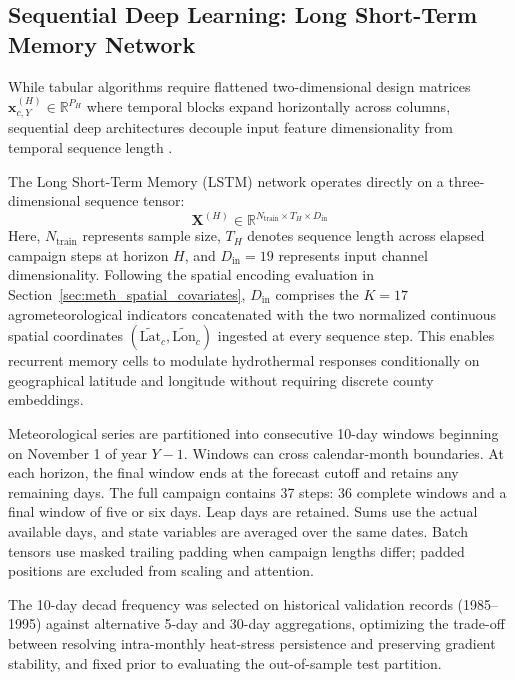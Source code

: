 \subsection{Sequential Deep Learning: Long Short-Term Memory Network}
\label{sec:meth_lstm}

While tabular algorithms require flattened two-dimensional design matrices $\mathbf{x}_{c,Y}^{(H)} \in \mathbb{R}^{P_H}$ where temporal blocks expand horizontally across columns, sequential deep architectures decouple input feature dimensionality from temporal sequence length \citep{Khaki2020}. 

The Long Short-Term Memory (LSTM) network operates directly on a three-dimensional sequence tensor:
\begin{equation}
    \mathbf{X}^{(H)} \in \mathbb{R}^{N_{\text{train}} \times T_H \times D_{\text{in}}}
    \label{eq:tensor_dimensions}
\end{equation}
Here, $N_{\text{train}}$ represents sample size, $T_H$ denotes sequence length across elapsed campaign steps at horizon $H$, and $D_{\text{in}} = 19$ represents input channel dimensionality. Following the spatial encoding evaluation in Section~\ref{sec:meth_spatial_covariates}, $D_{\text{in}}$ comprises the $K = 17$ agrometeorological indicators concatenated with the two normalized continuous spatial coordinates $(\tilde{\text{Lat}}_c, \tilde{\text{Lon}}_c)$ ingested at every sequence step. This enables recurrent memory cells to modulate hydrothermal responses conditionally on geographical latitude and longitude without requiring discrete county embeddings.

Meteorological series are partitioned into consecutive 10-day windows beginning on November 1 of year $Y-1$. Windows can cross calendar-month boundaries. At each horizon, the final window ends at the forecast cutoff and retains any remaining days. The full campaign contains 37 steps: 36 complete windows and a final window of five or six days. Leap days are retained. Sums use the actual available days, and state variables are averaged over the same dates. Batch tensors use masked trailing padding when campaign lengths differ; padded positions are excluded from scaling and attention. 

The 10-day decad frequency was selected on historical validation records (1985--1995) against alternative 5-day and 30-day aggregations, optimizing the trade-off between resolving intra-monthly heat-stress persistence and preserving gradient stability, and fixed prior to evaluating the out-of-sample test partition.

